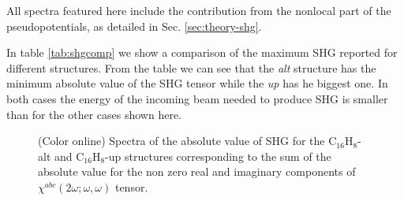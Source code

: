 \documentclass[pss]{wiley2sp} %
\begin{document}
All spectra featured here include the contribution from the nonlocal part of the pseudopotentials, as detailed in Sec. \ref{sec:theory-shg}.

In table \ref{tab:shgcomp} we show a comparison of the maximum SHG reported for different structures. From the table we can see that the \emph{alt} structure has the minimum absolute value of the SHG tensor while the \emph{up} has he biggest one. In both cases the energy of the incoming beam needed to produce SHG is smaller than for the other cases shown here.

\begin{figure}
\hfill
{}
\caption{(Color online) Spectra of the absolute value of SHG for the C$_{16}$H$_{8}$-alt 
    and C$_{16}$H$_{8}$-up structures corresponding to the sum of the absolute 
    value for the non zero real and imaginary components of $\chi^{abc}(2\omega;\omega,
    \omega) $ tensor.\label{fig:shg-abs-both}}
\end{figure}
\end{document}
